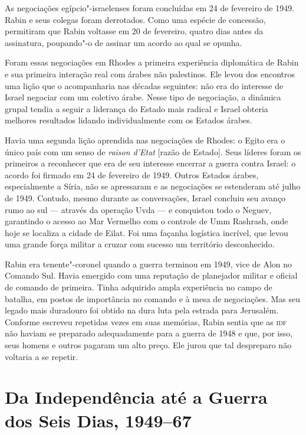 As negociações egípcio"-israelenses foram concluídas em 24 de fevereiro
de 1949. Rabin e seus colegas foram derrotados. Como uma espécie de
concessão, permitiram que Rabin voltasse em 20 de fevereiro, quatro dias
antes da assinatura, poupando"-o de assinar um acordo ao qual se opunha.

Foram essas negociações em Rhodes a primeira experiência diplomática de
Rabin e sua primeira interação real com árabes não palestinos. Ele levou
dos encontros uma lição que o acompanharia nas décadas seguintes: não
era do interesse de Israel negociar com um coletivo árabe. Nesse tipo de
negociação, a dinâmica grupal tendia a seguir a liderança do Estado mais
radical e Israel obteria melhores resultados lidando individualmente com
os Estados árabes.

Havia uma segunda lição aprendida nas negociações de Rhodes: o Egito era
o único país com um senso de \textit{raison d'Etat} {[}razão de Estado{]}. Seus líderes foram os
primeiros a reconhecer que era de seu interesse encerrar a guerra contra
Israel: o acordo foi firmado em 24 de fevereiro de 1949. Outros Estados
árabes, especialmente a Síria, não se apressaram e as negociações se
estenderam até julho de 1949. Contudo, mesmo durante as conversações, Israel
concluiu seu avanço rumo ao sul --- através da operação Uvda --- e
conquistou todo o Neguev, garantindo o acesso ao Mar Vermelho com o
controle de Umm Rashrash, onde hoje se localiza a cidade de Eilat. Foi
uma façanha logística incrível, que levou uma grande força militar a
cruzar com sucesso um território desconhecido.

Rabin era tenente"-coronel quando a guerra terminou em 1949, vice de Alon
no Comando Sul. Havia emergido com uma reputação de planejador militar e
oficial de comando de primeira. Tinha adquirido ampla experiência no
campo de batalha, em postos de importância no comando e à mesa de
negociações. Mas seu legado mais duradouro foi obtido na dura
luta pela estrada para Jerusalém. Conforme escreveu repetidas vezes em
suas memórias, Rabin sentia que as \textsc{idf} não haviam se preparado
adequadamente para a guerra de 1948 e que, por isso, seus homens e
outros pagaram um alto preço. Ele jurou que tal despreparo não voltaria
a se repetir.

\chapter[Da Independência até a Guerra dos Seis Dias, 1949--67]{Da Independência até a Guerra\\ dos Seis Dias, 1949--67}

